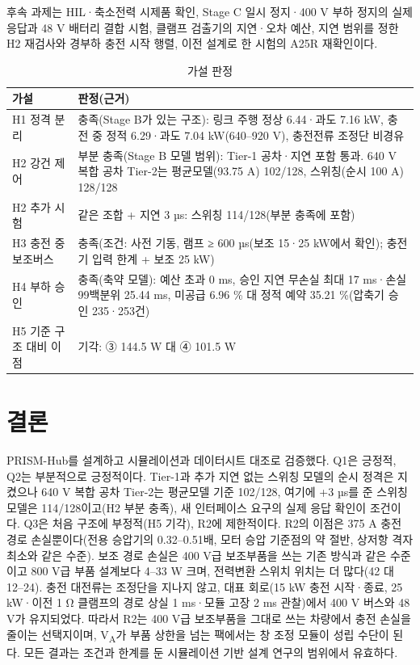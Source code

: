 \documentclass[10pt,a4paper,twocolumn]{article}
\begin{document}
후속 과제는 HIL·축소전력 시제품 확인, Stage C 일시 정지·400 V 부하 정지의 실제 응답과 48 V 배터리 결합 시험, 클램프 검출기의 지연·오차 예산, 지연 범위를 정한 H2 재검사와 경부하 충전 시작 행렬, 이전 설계로 한 시험의 A25R 재확인이다.

\begin{table}[t]
\centering
\caption{가설 판정}
\label{tab:hyp}
\footnotesize
\begin{tabular}{@{}L{0.25\columnwidth}L{0.69\columnwidth}@{}}
\toprule
가설 & 판정(근거) \\
\midrule
H1 정격 분리 & 충족(Stage B가 있는 구조): 링크 주행 정상 6.44·과도 7.16 kW, 충전 중 정적 6.29·과도 7.04 kW(640–920 V), 충전전류 조정단 비경유 \\
H2 강건 제어 & 부분 충족(Stage B 모델 범위): Tier-1 공차·지연 포함 통과. 640 V 복합 공차 Tier-2는 평균모델(93.75 A) 102/128, 스위칭(순시 100 A) 128/128 \\
H2 추가 시험 & 같은 조합 + 지연 3 µs: 스위칭 114/128(부분 충족에 포함) \\
H3 충전 중 보조버스 & 충족(조건: 사전 기동, 램프 ≥ 600 µs(보조 15·25 kW에서 확인); 충전기 입력 한계 + 보조 25 kW) \\
H4 부하 승인 & 충족(축약 모델): 예산 초과 0 ms, 승인 지연 무손실 최대 17 ms·손실 99백분위 25.44 ms, 미공급 6.96 \% 대 정적 예약 35.21 \%(압축기 승인 235·253건) \\
H5 기준 구조 대비 이점 & 기각: ③ 144.5 W 대 ④ 101.5 W \\
\bottomrule
\end{tabular}
\end{table}

\section{결론}

PRISM-Hub를 설계하고 시뮬레이션과 데이터시트 대조로 검증했다. Q1은 긍정적, Q2는 부분적으로 긍정적이다. Tier-1과 추가 지연 없는 스위칭 모델의 순시 정격은 지켰으나 640 V 복합 공차 Tier-2는 평균모델 기준 102/128, 여기에 +3 µs를 준 스위칭 모델은 114/128이고(H2 부분 충족), 새 인터페이스 요구의 실제 응답 확인이 조건이다. Q3은 처음 구조에 부정적(H5 기각), R2에 제한적이다. R2의 이점은 375 A 충전 경로 손실뿐이다(전용 승압기의 0.32–0.51배, 모터 승압 기준점의 약 절반, 상저항 격자 최소와 같은 수준). 보조 경로 손실은 400 V급 보조부품을 쓰는 기존 방식과 같은 수준이고 800 V급 부품 설계보다 4–33 W 크며, 전력변환 스위치 위치는 더 많다(42 대 12–24). 충전 대전류는 조정단을 지나지 않고, 대표 회로(15 kW 충전 시작·종료, 25 kW·이전 1 Ω 클램프의 경로 상실 1 ms·모듈 고장 2 ms 관찰)에서 400 V 버스와 48 V가 유지되었다. 따라서 R2는 400 V급 보조부품을 그대로 쓰는 차량에서 충전 손실을 줄이는 선택지이며, V\textsubscript{A}가 부품 상한을 넘는 팩에서는 창 조정 모듈이 성립 수단이 된다. 모든 결과는 조건과 한계를 둔 시뮬레이션 기반 설계 연구의 범위에서 유효하다.
\end{document}
